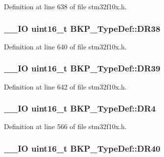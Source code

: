 Definition at line 638 of file stm32f10x.\-h.

\hypertarget{struct_b_k_p___type_def_accfaf41ee048545b7c9c0ed069165c6e}{
\subsubsection[{D\-R38}]{\setlength{\rightskip}{0pt plus 5cm}\-\_\-\-\_\-\-I\-O {\bf uint16\-\_\-t} B\-K\-P\-\_\-\-Type\-Def\-::\-D\-R38}}\label{struct_b_k_p___type_def_accfaf41ee048545b7c9c0ed069165c6e}


Definition at line 640 of file stm32f10x.\-h.

\hypertarget{struct_b_k_p___type_def_a599452e0f9d6e1e1fa75730aec9228fd}{
\subsubsection[{D\-R39}]{\setlength{\rightskip}{0pt plus 5cm}\-\_\-\-\_\-\-I\-O {\bf uint16\-\_\-t} B\-K\-P\-\_\-\-Type\-Def\-::\-D\-R39}}\label{struct_b_k_p___type_def_a599452e0f9d6e1e1fa75730aec9228fd}


Definition at line 642 of file stm32f10x.\-h.

\hypertarget{struct_b_k_p___type_def_a02abe76a58a7f018ea450221c955ab30}{
\subsubsection[{D\-R4}]{\setlength{\rightskip}{0pt plus 5cm}\-\_\-\-\_\-\-I\-O {\bf uint16\-\_\-t} B\-K\-P\-\_\-\-Type\-Def\-::\-D\-R4}}\label{struct_b_k_p___type_def_a02abe76a58a7f018ea450221c955ab30}


Definition at line 566 of file stm32f10x.\-h.

\hypertarget{struct_b_k_p___type_def_a1811cf03bde48bc9becc8795d3e09d7f}{
\subsubsection[{D\-R40}]{\setlength{\rightskip}{0pt plus 5cm}\-\_\-\-\_\-\-I\-O {\bf uint16\-\_\-t} B\-K\-P\-\_\-\-Type\-Def\-::\-D\-R40}}\label{struct_b_k_p___type_def_a1811cf03bde48bc9becc8795d3e09d7f}


